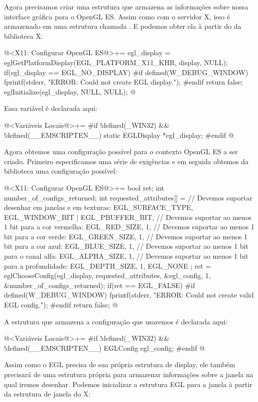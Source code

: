 Agora precisamos criar uma estrutura que armazena as informações sobre
nossa interface gráfica para o OpenGL ES. Assim como com o servidor X,
isso é armazenado em uma estrutura chamada . E
podemos obter ela à partir do  da biblioteca X:

\iniciocodigo
@<X11: Configurar OpenGL ES@>+=
egl_display = eglGetPlatformDisplay(EGL_PLATFORM_X11_KHR, display,
                                    NULL);
if(egl_display == EGL_NO_DISPLAY){
#if defined(W_DEBUG_WINDOW)
  fprintf(stderr, "ERROR: Could not create EGL display.\n");
#endif
  return false;
}
eglInitialize(egl_display, NULL, NULL);
@
\fimcodigo

Essa variável é declarada aqui:

\iniciocodigo
@<Variáveis Locais@>+=
#if !defined(_WIN32) && !defined(__EMSCRIPTEN__)
static EGLDisplay *egl_display;
#endif
@
\fimcodigo

Agora obtemos uma configuração possível para o contexto OpenGL ES a
ser criado. Primeiro especificamos uma série de exigências e em
seguida obtemos da biblioteca uma configuração possível:

\iniciocodigo
@<X11: Configurar OpenGL ES@>+=
{
  bool ret;
  int number_of_configs_returned;
  int requested_attributes[] = {
    // Devemos suportar desenhar em janelas e em texturas:
    EGL_SURFACE_TYPE,  EGL_WINDOW_BIT | EGL_PBUFFER_BIT,
    // Devemos suportar ao menos 1 bit para a cor vermelha:
    EGL_RED_SIZE, 1,
    // Devemos suportar ao menos 1 bit para a cor verde:
    EGL_GREEN_SIZE, 1,
    // Devemos suportar ao menos 1 bit para a cor azul:
    EGL_BLUE_SIZE, 1,
    // Devemos suportar ao menos 1 bit para o canal alfa:
    EGL_ALPHA_SIZE, 1,
    // Devemos suportar ao menos 1 bit para a profundidade:
    EGL_DEPTH_SIZE, 1,
    EGL_NONE
  };
  ret = eglChooseConfig(egl_display, requested_attributes,
                        &egl_config, 1, &number_of_configs_returned);
  if(ret == EGL_FALSE){
#if defined(W_DEBUG_WINDOW)
    fprintf(stderr, "ERROR: Could not create valid EGL config.\n");
#endif
    return false;
  }
}
@
\fimcodigo

A estrutura que armazena a configuração que usaremos é declarada aqui:

\iniciocodigo
@<Variáveis Locais@>+=
#if !defined(_WIN32) && !defined(__EMSCRIPTEN__)
EGLConfig egl_config;
#endif
@
\fimcodigo


Assim como o EGL precisa de sua própria estrutura de display, ele
também precisará de uma estrutura própria para armazenar informações
sobre a janela na qual iremos desenhar. Podemos inicializar a
estrutura EGL para a janela à partir da estrutura de janela do X:

